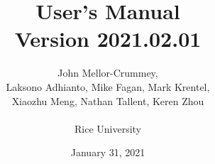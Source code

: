 \documentclass[11pt,letterpaper]{report}
\begin{document}

\title{\HPCToolkit{} User's Manual\\[.5in]Version 2021.02.01}

\author{John Mellor-Crummey,\\
Laksono Adhianto,
Mike Fagan,
Mark Krentel,\\
Xiaozhu Meng,
Nathan Tallent, Keren Zhou\\
\\
Rice University\\
}

\date{January 31, 2021}

\maketitle



\setcounter{page}{1}







\begin{singlespace}

\newpage

\pagestyle{empty}
\thispagestyle{empty}
\tableofcontents



\end{singlespace}
\end{document}
